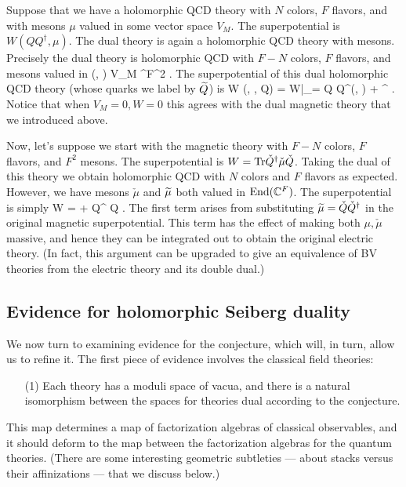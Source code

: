 \documentclass[11pt]{amsart}
\def\til{\Tilde}
\def\C{{\mathbb{C}}}
\begin{document}
Suppose that we have a holomorphic QCD theory with $N$ colors, $F$ flavors, and with mesons $\mu$ valued in some vector space $V_M$. 
The superpotential is $W(QQ^\dagger, \mu)$.
The dual theory is again a holomorphic QCD theory with mesons.
Precisely the dual theory is holomorphic QCD with $F-N$ colors, $F$ flavors, and mesons valued in 
\beqn
(\mu, \til \mu) \in V_M \oplus \C^{F^2} .
\eeqn
The superpotential of this dual holomorphic QCD theory (whose quarks we label by $\til Q$) is 
\beqn
\til W (\mu, \til \mu, \til Q) = W|_{\til \mu = Q Q^\dagger}(\mu, \til \mu) + \Tr \til{Q}^\dagger \til{\mu} \til{Q} .
\eeqn
Notice that when $V_M = 0, W=0$ this agrees with the dual magnetic theory that we introduced above. 

Now, let's suppose we start with the magnetic theory with $F-N$ colors, $F$ flavors, and $F^2$ mesons.
The superpotential is $W = {\rm Tr} \check{Q}^\dagger \check{\mu} \check{Q}$. 
Taking the dual of this theory we obtain holomorphic QCD with $N$ colors and $F$ flavors as expected.
However, we have mesons $\check{\mu}$ and $\til \mu$ both valued in $\End(\C^F)$. 
The superpotential is simply
\beqn
\til W = \Tr \check \mu \til \mu + \Tr \til Q^\dagger \check{\mu} \til Q .
\eeqn
The first term arises from substituting $\til \mu = \check Q \check Q^\dagger$ in the original magnetic superpotential. 
This term has the effect of making both $\mu,\check \mu$ massive, and hence they can be integrated out to obtain the original electric theory. 
(In fact, this argument can be upgraded to give an equivalence of BV theories from the electric theory and its double dual.)

\subsection{Evidence for holomorphic Seiberg duality}

We now turn to examining evidence for the conjecture, which will, in turn, allow us to refine it.
The first piece of evidence involves the classical field theories:
\begin{enumerate}
\item[(1)] Each theory has a moduli space of vacua, and there is a natural isomorphism between the spaces for theories dual according to the conjecture.
\end{enumerate}
This map determines a map of factorization algebras of classical observables,
and it should deform to the map between the factorization algebras for the quantum theories.
(There are some interesting geometric subtleties --- about stacks versus their affinizations --- that we discuss below.)
\end{document}
